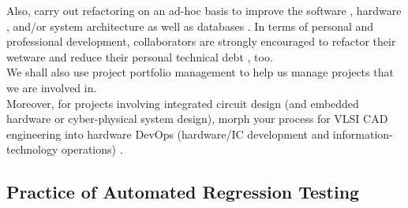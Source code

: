 \documentclass[letter,12pt]{article}
\begin{document}
Also, carry out refactoring \cite{Fields2010,Fowler1999} on an ad-hoc basis to improve the software \cite{Dooley2017,Jeffries2015,Babar2014,Fox2013,Crookshanks2012,Bender2011,DiGennaro2011,Koopman2010,Shore2008,Spolsky2008,Meszaros2007,37signalsStaff2006,Feathers2005,Kerievsky2005,Evans2004,McConnell2004,Stevens2000,Brown1998}, hardware \cite{WikipediaContributors2018m,Faes2010,Haynal2009,Faes2008,Haynal2008,Haynal2008a,Zeng2006,Zeng2005,Keating2002,Keating1999}, and/or system \cite{Collier2012,Rothman2007,Laplante2004} architecture as well as databases \cite{Ambler2006}. In terms of personal and professional development, collaborators are strongly encouraged to refactor their wetware \cite{Hunt2008} and reduce their personal technical debt \cite{Levin2017,Aboulafia2016,Davis2013a,Prause2011,Gadoury2010}, too. \\

We shall also use project portfolio management \cite{Rothman2016a,Rothman2009} to help us manage projects that we are involved in. \\

Moreover, for projects involving integrated circuit design (and embedded hardware or cyber-physical system design), morph your process for VLSI CAD engineering into hardware DevOps (hardware/IC development and information-technology operations) \cite{MythicIncStaff2018}.




















\subsection{Practice of Automated Regression Testing}
\label{ssec:PracticeOfAutomatedRegressionTesting}
\end{document}
